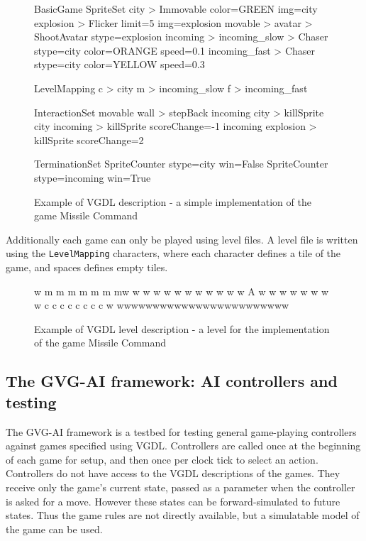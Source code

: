 \documentclass[a4paper,titlepage,final]{report}
\begin{document}
\begin{figure}[!ht]
\centering
\begin{vgdldesc}[linewidth=14cm]
BasicGame
	SpriteSet
		city  > Immovable color=GREEN img=city
		explosion > Flicker limit=5 img=explosion
		movable >
			avatar  > ShootAvatar stype=explosion
			incoming >
				incoming_slow  > Chaser stype=city color=ORANGE speed=0.1
				incoming_fast  > Chaser stype=city color=YELLOW speed=0.3

	LevelMapping
		c > city
		m > incoming_slow
		f > incoming_fast
		
	InteractionSet
		movable wall  > stepBack
		incoming city > killSprite
		city incoming > killSprite scoreChange=-1
		incoming explosion > killSprite scoreChange=2

	TerminationSet
		SpriteCounter stype=city   win=False
		SpriteCounter stype=incoming win=True
\end{vgdldesc}
\caption{Example of VGDL description - a simple implementation of the game Missile Command}
\label{fig:vgdlgame}
\end{figure}

Additionally each game can only be played using level files. 
A level file is written using the \texttt{LevelMapping} characters, where each character defines a tile of the game, and spaces defines empty tiles.

\begin{figure}[!ht]
\centering
\begin{vgdldesc}[linewidth=14cm]
w    m  m   m  m  m m mw
w                      w
w                      w
w                      w
w                      w
w                      w
w           A          w
w                      w
w                      w
w                      w
w   c c c c c c c c    w
wwwwwwwwwwwwwwwwwwwwwwww
\end{vgdldesc}
\caption{Example of VGDL level description - a level for the implementation of the game Missile Command}
\label{fig:vgdlgame_level}
\end{figure}



\subsection{The GVG-AI framework: AI controllers and testing}
\label{ssec:aicontrollersandtesting}
The GVG-AI framework is a testbed for testing general game-playing controllers against games specified using VGDL. Controllers are called once at the beginning of each game for setup, and then once per clock tick to select an action. Controllers do not have access to the VGDL descriptions of the games. They receive only the game's current state, passed as a parameter when the controller is asked for a move. However these states can be forward-simulated to future states. Thus the game rules are not directly available, but a simulatable model of the game can be used.
\end{document}

